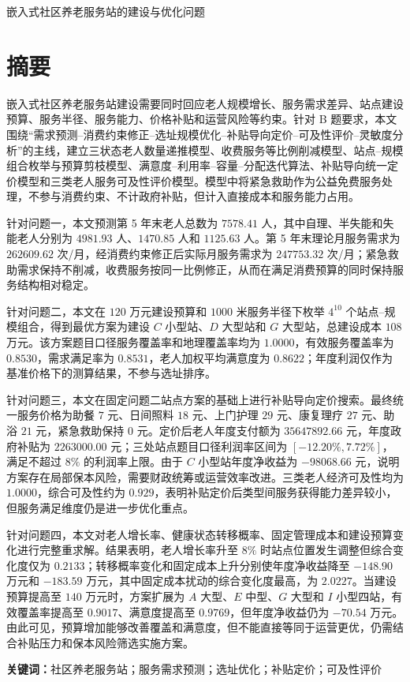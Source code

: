 \begin{center}
  {\heiti 嵌入式社区养老服务站的建设与优化问题}
\end{center}

\section*{摘要}

\noindent
嵌入式社区养老服务站建设需要同时回应老人规模增长、服务需求差异、站点建设预算、服务半径、服务能力、价格补贴和运营风险等约束。针对 B 题要求，本文围绕“需求预测--消费约束修正--选址规模优化--补贴导向定价--可及性评价--灵敏度分析”的主线，建立三状态老人数量递推模型、收费服务等比例削减模型、站点--规模组合枚举与预算剪枝模型、满意度--利用率--容量--分配迭代算法、补贴导向统一定价模型和三类老人服务可及性评价模型。模型中将紧急救助作为公益免费服务处理，不参与消费约束、不计政府补贴，但计入直接成本和服务能力占用。

\noindent
针对问题一，本文预测第 5 年末老人总数为 $7578.41$ 人，其中自理、半失能和失能老人分别为 $4981.93$ 人、$1470.85$ 人和 $1125.63$ 人。第 5 年末理论月服务需求为 $262609.62$ 次/月，经消费约束修正后实际月服务需求为 $247753.32$ 次/月；紧急救助需求保持不削减，收费服务按同一比例修正，从而在满足消费预算的同时保持服务结构相对稳定。

\noindent
针对问题二，本文在 $120$ 万元建设预算和 $1000$ 米服务半径下枚举 $4^{10}$ 个站点--规模组合，得到最优方案为建设 $C$ 小型站、$D$ 大型站和 $G$ 大型站，总建设成本 $108$ 万元。该方案题目口径服务覆盖率和地理覆盖率均为 $1.0000$，有效服务覆盖率为 $0.8530$，需求满足率为 $0.8531$，老人加权平均满意度为 $0.8622$；年度利润仅作为基准价格下的测算结果，不参与选址排序。

\noindent
针对问题三，本文在固定问题二站点方案的基础上进行补贴导向定价搜索。最终统一服务价格为助餐 $7$ 元、日间照料 $18$ 元、上门护理 $29$ 元、康复理疗 $27$ 元、助浴 $21$ 元，紧急救助保持 $0$ 元。定价后老人年度支付额为 $35647892.66$ 元，年度政府补贴为 $2263000.00$ 元；三处站点题目口径利润率区间为 $[-12.20\%,7.72\%]$，满足不超过 $8\%$ 的利润率上限。由于 $C$ 小型站年度净收益为 $-98068.66$ 元，说明方案存在局部保本风险，需要财政统筹或运营效率改进。三类老人经济可及性均为 $1.0000$，综合可及性约为 $0.929$，表明补贴定价后类型间服务获得能力差异较小，但服务满足维度仍是进一步优化重点。

\noindent
针对问题四，本文对老人增长率、健康状态转移概率、固定管理成本和建设预算变化进行完整重求解。结果表明，老人增长率升至 $8\%$ 时站点位置发生调整但综合变化度仅为 $0.2133$；转移概率变化和固定成本上升分别使年度净收益降至 $-148.90$ 万元和 $-183.59$ 万元，其中固定成本扰动的综合变化度最高，为 $2.0227$。当建设预算提高至 $140$ 万元时，方案扩展为 $A$ 大型、$E$ 中型、$G$ 大型和 $I$ 小型四站，有效覆盖率提高至 $0.9017$、满意度提高至 $0.9769$，但年度净收益仍为 $-70.54$ 万元。由此可见，预算增加能够改善覆盖和满意度，但不能直接等同于运营更优，仍需结合补贴压力和保本风险筛选实施方案。

\noindent\textbf{关键词：}社区养老服务站；服务需求预测；选址优化；补贴定价；可及性评价
